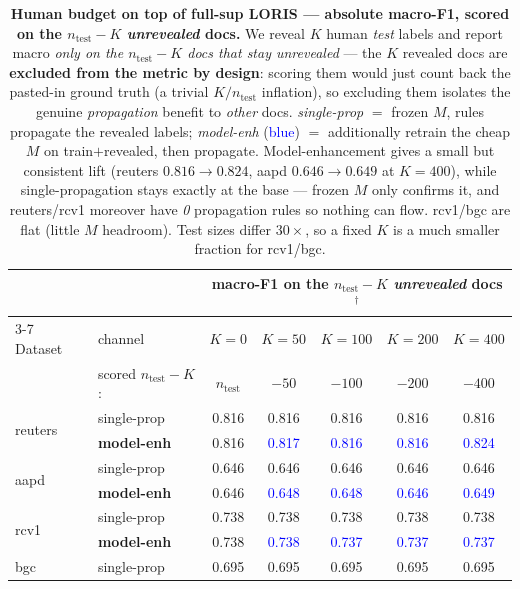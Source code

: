 \documentclass[11pt]{article}
\newcommand{\bld}[1]{\textbf{#1}}\newcommand{\gn}[1]{\textcolor{blue}{#1}}
\begin{document}
\begin{table}[h]\centering
\caption{\textbf{Human budget on top of full-sup LORIS --- absolute macro-F1, scored on the
$n_{\text{test}}{-}K$ \emph{unrevealed} docs.} We reveal $K$ human \emph{test} labels and report macro
\emph{only on the $n_{\text{test}}{-}K$ docs that stay unrevealed} --- the $K$ revealed docs are
\textbf{excluded from the metric by design}: scoring them would just count back the pasted-in ground
truth (a trivial $K/n_{\text{test}}$ inflation), so excluding them isolates the genuine \emph{propagation}
benefit to \emph{other} docs. \emph{single-prop} $=$ frozen $M$, rules propagate the revealed labels;
\emph{model-enh} (\gn{blue}) $=$ additionally retrain the cheap $M$ on train$+$revealed, then propagate.
Model-enhancement gives a small but consistent lift (reuters $0.816\!\to\!0.824$, aapd $0.646\!\to\!0.649$
at $K{=}400$), while single-propagation stays exactly at the base --- frozen $M$ only confirms it, and
reuters/rcv1 moreover have \emph{0} propagation rules so nothing can flow. rcv1/bgc are flat (little $M$
headroom). Test sizes differ $30\times$, so a fixed $K$ is a much smaller fraction for rcv1/bgc.}
\label{tab:human}\small
\begin{tabular}{llccccc}
\toprule
 &  & \multicolumn{5}{c}{macro-F1 on the $n_{\text{test}}{-}K$ \emph{unrevealed} docs$^{\dagger}$} \\
\cmidrule(lr){3-7}
Dataset & channel & $K{=}0$ & $K{=}50$ & $K{=}100$ & $K{=}200$ & $K{=}400$ \\
 & {\footnotesize scored $n_{\text{test}}{-}K$:} & {\footnotesize $n_{\text{test}}$} & {\footnotesize $-50$} & {\footnotesize $-100$} & {\footnotesize $-200$} & {\footnotesize $-400$} \\
\midrule
\multirow{2}{*}{reuters} & single-prop & 0.816 & 0.816 & 0.816 & 0.816 & 0.816 \\
 & \bld{model-enh} & 0.816 & \gn{0.817} & \gn{0.816} & \gn{0.816} & \gn{0.824} \\
\midrule
\multirow{2}{*}{aapd} & single-prop & 0.646 & 0.646 & 0.646 & 0.646 & 0.646 \\
 & \bld{model-enh} & 0.646 & \gn{0.648} & \gn{0.648} & \gn{0.646} & \gn{0.649} \\
\midrule
\multirow{2}{*}{rcv1} & single-prop & 0.738 & 0.738 & 0.738 & 0.738 & 0.738 \\
 & \bld{model-enh} & 0.738 & \gn{0.738} & \gn{0.737} & \gn{0.737} & \gn{0.737} \\
\midrule
\multirow{2}{*}{bgc} & single-prop & 0.695 & 0.695 & 0.695 & 0.695 & 0.695 \\

\end{tabular}
\end{table}
\end{document}
